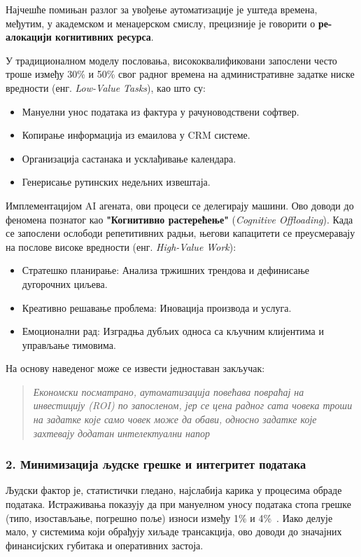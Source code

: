 Најчешће помињан разлог за увођење аутоматизације је уштеда времена, међутим, у академском и менаџерском смислу, прецизније је говорити о \textbf{ре-алокацији когнитивних ресурса}.

У традиционалном моделу пословања, висококвалификовани запослени често троше између 30\% и 50\% свог радног времена на административне задатке ниске вредности (енг. \textit{Low-Value Tasks}), као што су:
\begin{itemize}
    \item Мануелни унос података из фактура у рачуноводствени софтвер.
    \item Копирање информација из емаилова у CRM системе.
    \item Организација састанака и усклађивање календара.
    \item Генерисање рутинских недељних извештаја.
\end{itemize}

Имплементацијом AI агената, ови процеси се делегирају машини. Ово доводи до феномена познатог као \textbf{"Когнитивно растерећење"} (\textit{Cognitive Offloading}). Када се запослени ослободи репетитивних радњи, његови капацитети се преусмеравају на послове високе вредности (енг. \textit{High-Value Work}):
\begin{itemize}
    \item Стратешко планирање: Анализа тржишних трендова и дефинисање дугорочних циљева.
    \item Креативно решавање проблема: Иновација производа и услуга.
    \item Емоционални рад: Изградња дубљих односа са кључним клијентима и управљање тимовима.
\end{itemize}

На основу наведеног може се извести једноставан закључак:
\begin{quote}
\textit{Економски посматрано, аутоматизација повећава повраћај на инвестицију (ROI) по запосленом, јер се цена радног сата човека троши на задатке које само човек може да обави, односно задатке које захтевају додатан интелектуални напор}
\end{quote}

\subsubsection*{2. Минимизација људске грешке и интегритет података}

Људски фактор је, статистички гледано, најслабија карика у процесима обраде података. Истраживања показују да при мануелном уносу података стопа грешке (типо, изостављање, погрешно поље) износи између 1\% и 4\%~\cite{vanderaalst2016}. Иако делује мало, у системима који обрађују хиљаде трансакција, ово доводи до значајних финансијских губитака и оперативних застоја.

